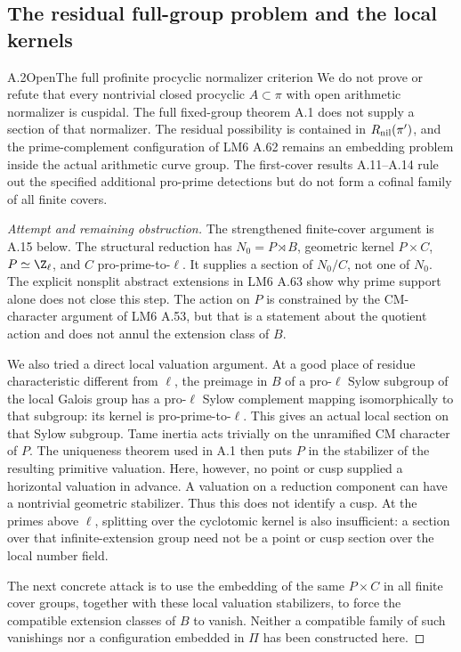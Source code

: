 \subsection{The residual full-group problem and the local kernels}

\begin{statement}{A.2}{Open}{The full profinite procyclic normalizer criterion}
We do not prove or refute that every nontrivial closed procyclic
$A\subset\pi$ with open arithmetic normalizer is cuspidal.
The full fixed-group theorem A.1 does not supply a section of that
normalizer. The residual possibility is contained in
$R_{\rm nil}(\pi')$, and the prime-complement configuration of
LM6 A.62 remains an embedding problem inside the actual arithmetic
curve group. The first-cover results A.11--A.14 rule out the
specified additional pro-prime detections but do not form a cofinal
family of all finite covers.
\end{statement}
\begin{proof}[Attempt and remaining obstruction]
The strengthened finite-cover argument is A.15 below. The structural
reduction has $N_0=P\rtimes B$, geometric kernel $P\times C$,
$P\simeq\Z_\ell$, and $C$ pro-prime-to-$\ell$. It supplies a
section of $N_0/C$, not one of $N_0$. The explicit nonsplit abstract
extensions in LM6 A.63 show why prime support alone does not close
this step. The action on $P$ is constrained by the CM-character
argument of LM6 A.53, but that is a statement about the quotient
action and does not annul the extension class of $B$.

We also tried a direct local valuation argument. At a good place
of residue characteristic different from $\ell$, the preimage in
$B$ of a pro-$\ell$ Sylow subgroup of the local Galois group has a
pro-$\ell$ Sylow complement mapping isomorphically to that subgroup:
its kernel is pro-prime-to-$\ell$. This gives an actual local
section on that Sylow subgroup. Tame inertia acts trivially on the
unramified CM character of $P$. The uniqueness theorem used in A.1
then puts $P$ in the stabilizer of the resulting primitive valuation.
Here, however, no point or cusp supplied a horizontal valuation in
advance. A valuation on a reduction component can have a nontrivial
geometric stabilizer. Thus this does not identify a cusp.
At the primes above $\ell$, splitting over the cyclotomic kernel
is also insufficient: a section over that infinite-extension group
need not be a point or cusp section over the local number field.

The next concrete attack is to use the embedding of the same
$P\times C$ in all finite cover groups, together with these local
valuation stabilizers, to force the compatible extension classes
of $B$ to vanish. Neither a compatible family of such vanishings
nor a configuration embedded in $\Pi$ has been constructed here.
\end{proof}


